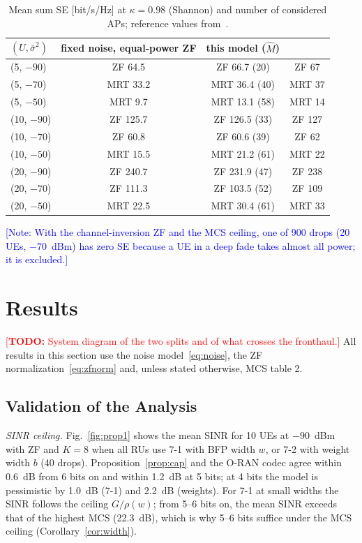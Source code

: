 \documentclass[10pt, final, journal, letterpaper, twocolumn]{IEEEtran}
\newcommand{\todo}[1]{\textcolor{red}{[\textbf{TODO:} #1]}}
\newcommand{\note}[1]{\textcolor{blue}{[Note: #1]}}
\begin{document}
\begin{table}[t]
\centering
\caption{Mean sum SE [bit/s/Hz] at $\kappa=0.98$ (Shannon) and number of considered APs; reference values from~\cite[Fig.~5]{girycki2024eucnc}.}
\label{tab:repro}
\footnotesize
\begin{tabular}{@{}lccc@{}}
\toprule
$(U,\bar\sigma^2)$ & fixed noise, equal-power ZF & this model ($\hat M$) & \cite{girycki2024eucnc} \\
\midrule
(5, $-90$) & ZF 64.5 & ZF 66.7 (20) & ZF 67 \\
(5, $-70$) & MRT 33.2 & MRT 36.4 (40) & MRT 37 \\
(5, $-50$) & MRT 9.7 & MRT 13.1 (58) & MRT 14 \\
(10, $-90$) & ZF 125.7 & ZF 126.5 (33) & ZF 127 \\
(10, $-70$) & ZF 60.8 & ZF 60.6 (39) & ZF 62 \\
(10, $-50$) & MRT 15.5 & MRT 21.2 (61) & MRT 22 \\
(20, $-90$) & ZF 240.7 & ZF 231.9 (47) & ZF 238 \\
(20, $-70$) & ZF 111.3 & ZF 103.5 (52) & ZF 109 \\
(20, $-50$) & MRT 22.5 & MRT 30.4 (61) & MRT 33 \\
\bottomrule
\end{tabular}
\end{table}

\note{With the channel-inversion ZF and the MCS ceiling, one of 900 drops (20 UEs, $-70$~dBm) has zero SE because a UE in a deep fade takes almost all power; it is excluded.}

\section{Results}
\label{sec:results}

\todo{System diagram of the two splits and of what crosses the fronthaul.} All results in this section use the noise model~\eqref{eq:noise}, the ZF normalization~\eqref{eq:zfnorm} and, unless stated otherwise, MCS table 2.

\subsection{Validation of the Analysis}
\label{subsec:validation}

\emph{SINR ceiling.} Fig.~\ref{fig:prop1} shows the mean SINR for 10 UEs at $-90$~dBm with ZF and $K=8$ when all RUs use 7-1 with BFP width $w$, or 7-2 with weight width $b$ (40 drops). Proposition~\ref{prop:cap} and the O-RAN codec agree within 0.6~dB from 6 bits on and within 1.2~dB at 5 bits; at 4 bits the model is pessimistic by 1.0~dB (7-1) and 2.2~dB (weights). For 7-1 at small widths the SINR follows the ceiling $G/\rho(w)$; from 5--6 bits on, the mean SINR exceeds that of the highest MCS (22.3~dB), which is why 5--6 bits suffice under the MCS ceiling (Corollary~\ref{cor:width}).
\end{document}
